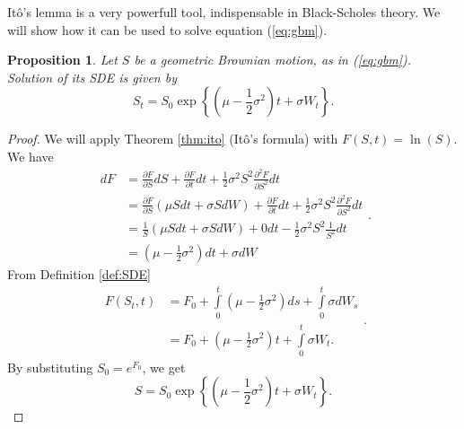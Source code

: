 \documentclass[a4paper,12pt, oneside]{book}
\newtheorem{prop}[thm]{Proposition}
\theoremstyle{definition}
\theoremstyle{remark}
\begin{document}
It\^{o}'s lemma is a very powerfull tool, indispensable in Black-Scholes theory. We will show how it can be used to solve equation (\ref{eq:gbm}).
\begin{prop}
\label{prop:solution_dynamics}
 Let $S$ be a geometric Brownian motion, as in (\ref{eq:gbm}).
 Solution of its SDE is given by
 \begin{equation}
  \label{eq:gmb_sol}
  S_t = S_0 \exp\left\{ (\mu - \frac{1}{2}\sigma^2)t + \sigma W_t \right\}.
 \end{equation}
\end{prop}
\begin{proof}
We will apply Theorem \ref{thm:ito} (It\^{o}'s formula) with $F(S,t) = \ln(S)$. We have
 \begin{equation*}
  \begin{split}
   dF &= \frac{\partial F}{\partial S}dS + \frac{\partial F}{\partial t}dt + \frac{1}{2}\sigma^2 S^2 \frac{\partial^2 F}{\partial S^2}dt \\
   &= \frac{\partial F}{\partial S}(\mu S dt + \sigma S dW) + \frac{\partial F}{\partial t}dt + \frac{1}{2}\sigma^2 S^2 \frac{\partial^2 F}{\partial S^2}dt \\    
   &= \frac{1}{S}(\mu S dt + \sigma S dW) + 0dt - \frac{1}{2}\sigma^2 S^2 \frac{1}{S^2}dt \\   
   &= (\mu - \frac{1}{2}\sigma^2) dt + \sigma dW
  \end{split}.
 \end{equation*}
 From Definition \ref{def:SDE}
 \begin{equation*}
  \begin{split}
  F(S_t,t) &= F_0 + \int\limits_0^t (\mu - \frac{1}{2}\sigma^2) ds + \int\limits_0^t \sigma dW_s\\
  &= F_0 + (\mu - \frac{1}{2}\sigma^2)t + \int\limits_0^t \sigma W_t. 
  \end{split}.
 \end{equation*}
 By substituting $S_0 = e^{F_0}$, we get
 \[ S = S_0 \exp\left\{ (\mu - \frac{1}{2}\sigma^2)t + \sigma W_t \right\}. \] 
\end{proof}
\end{document}
